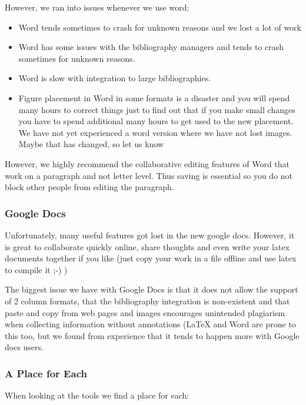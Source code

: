 However, we ran into issues whenever we use word:

\begin{itemize}

\item
  Word tends sometimes to crash for unknown reasons and we lost a lot of
  work
\item
  Word has some issues with the bibliography managers and tends to crash
  sometimes for unknown reasons.
\item
  Word is slow with integration to large bibliographies.
\item
  Figure placement in Word in some formats is a disaster and you will
  spend many hours to correct things just to find out that if you make
  small changes you have to spend additional many hours to get used to
  the new placement. We have not yet experienced a word version where we
  have not lost images. Maybe that has changed, so let us know
\end{itemize}

However, we highly recommend the collaborative editing features of Word
that work on a paragraph and not letter level. Thus saving is essential
so you do not block other people from editing the paragraph.

\subsubsection{Google Docs}\label{google-docs}

Unfortunately, many useful features got lost in the new google docs.
However, it is great to collaborate quickly online, share thoughts and
even write your latex documents together if you like (just copy your
work in a file offline and use latex to compile it ;-) )

The biggest issue we have with Google Docs is that it does not allow the
support of 2 column formats, that the bibliography integration is
non-existent and that paste and copy from web pages and images
encourages unintended plagiarism when collecting information without
annotations (LaTeX and Word are prone to this too, but we found from
experience that it tends to happen more with Google docs users.

\subsubsection{A Place for Each}\label{a-place-for-each}

When looking at the tools we find a place for each:

